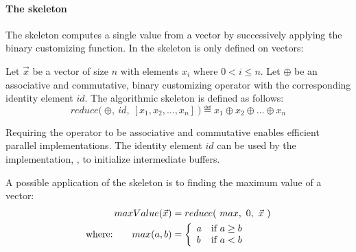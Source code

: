 \paragraph{The \reduce skeleton}
The \reduce skeleton computes a single value from a vector by successively applying the binary customizing function.
In \SkelCL the \reduce skeleton is only defined on vectors:
\begin{definition}
  \label{definition:reduce}
  Let $\vec{x}$ be a vector of size $n$ with elements $x_i$ where $0 < i \leq n$.
  Let $\oplus$ be an associative and commutative, binary customizing operator with the corresponding identity element $id$.
  The algorithmic skeleton \reduce is defined as follows:
  \begin{equation*}
    reduce \big(\ \oplus,\ id,\ [x_1, x_2, \dots, x_n]\ \big)
      \eqdef x_1 \oplus x_2 \oplus \dots \oplus x_n
  \end{equation*}
\end{definition}
\noindent
Requiring the operator to be associative and commutative enables efficient parallel implementations.
The identity element $id$ can be used by the implementation, \eg, to initialize intermediate buffers.

A possible application of the \reduce skeleton is to finding the maximum value of a vector:
\begin{align*}
  maxValue(\vec{x}) &= reduce(\ max,\ 0,\ \vec{x}\ )\\
  \text{where:} \qquad max(a, b) &=
    \left\{
      \begin{array}{l l}
      a & \text{if } a \geq b\\
      b & \text{if } a < b
      \end{array}
    \right.
\end{align*}



